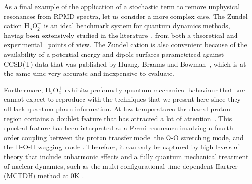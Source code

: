 \documentclass[aps,prb,superscriptaddress,amsmath,amssymb,showpacs,twocolumn]{revtex4}
\begin{document}
As a final example of the application of a stochastic term to remove unphysical resonances 
from RPMD spectra, let us consider a more complex case. The Zundel cation H$_5$O$_2^+$ 
is an ideal benchmark system for quantum dynamics methods, having been 
extensively studied in the literature~\cite{Schatteburg2008}, from both a theoretical
\cite{AgostiniCiccotti2011, ParkKim2007, VenerSauer2001, SauerDoebler2005, ChengKrause1997, VendrellMeyer2007, 
BaerMarxMathias2010, KaledinBowmanJordan2009, HuangBraamsBowman2005} 
and experimental~\cite{YehLee1989, GuascoJohnson2011, AsmisScience2003, HammerBowmanCarter2005, FridgenMaitre2004}
points of view. The Zundel cation is also convenient because of the availability of a 
potential energy and dipole surfaces parametrized against CCSD(T) data that was 
published by Huang, Braams and Bowman~\cite{HuangBraamsBowman2005},
which is at the same time very accurate and inexpensive to evaluate. 

Furthermore, H$_5$O$_2^+$ exhibits profoundly quantum mechanical behaviour
that one cannot expect to reproduce with the techniques that we present here
since they all lack quantum phase information. 
At low temperatures the shared proton region contains a doublet feature 
that has attracted a lot of attention~\cite{GuascoJohnson2011, HammerBowmanCarter2005}.
This spectral feature has been interpreted as a Fermi resonance
involving a fourth-order coupling between the proton transfer mode,
the O-O stretching mode, and the H-O-H wagging mode \cite{VendrellMeyer2007, Schatteburg2008}. 
Therefore, it can only be captured by high levels of theory that include 
anharmonic effects and a fully quantum mechanical treatment
of nuclear dynamics, such as the multi-configurational time-dependent Hartree (MCTDH) method at
0K \cite{VendrellMeyer2007}.
\end{document}

